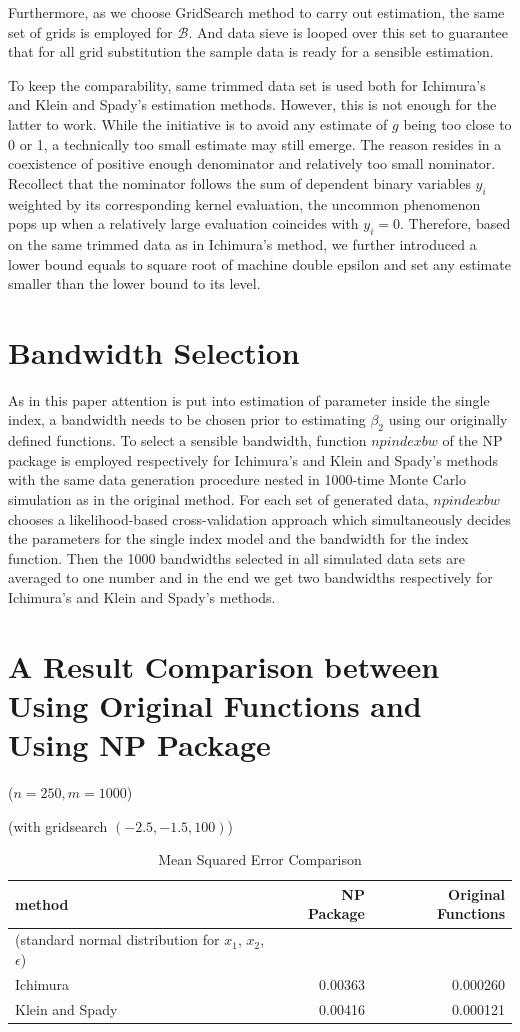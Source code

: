 \documentclass[a4paper]{article}
\begin{document}
Furthermore, as we choose GridSearch method to carry out estimation, the same set of grids is employed for $\mathcal{B}$. And data sieve is looped over this set to guarantee that for all grid substitution the sample data is ready for a sensible estimation.

To keep the comparability, same trimmed data set is used both for Ichimura's and Klein and Spady's estimation methods. However, this is not enough for the latter to work. While the initiative is to avoid any estimate of $g$ being too close to 0 or 1, a technically too small estimate may still emerge. The reason resides in a coexistence of positive enough denominator and relatively too small nominator. Recollect that the nominator follows the sum of dependent binary variables $y_i$ weighted by its corresponding kernel evaluation, the uncommon phenomenon pops up when a relatively large evaluation coincides with $y_i = 0$. Therefore, based on the same trimmed data as in Ichimura's method, we further introduced a lower bound equals to square root of machine double epsilon and set any estimate smaller than the lower bound to its level.

\section{Bandwidth Selection}
As in this paper attention is put into estimation of parameter inside the single index, a bandwidth needs to be chosen prior to estimating $\beta_2$ using our originally defined functions. To select a sensible bandwidth, function $npindexbw$ of the NP package is employed respectively for Ichimura's and Klein and Spady's methods with the same data generation procedure nested in 1000-time Monte Carlo simulation as in the original method. For each set of generated data, $npindexbw$ chooses a likelihood-based cross-validation approach which simultaneously decides the parameters for the single index model and the bandwidth for the index function. Then the 1000 bandwidths selected in all simulated data sets are averaged to one number and in the end we get two bandwidths respectively for Ichimura's and Klein and Spady's methods.

\section{A Result Comparison between Using Original Functions and Using NP Package}
($n = 250, m = 1000$)

\begin{table}[H]
\caption {Mean Squared Error Comparison} \label{tab:mean squared error}

(with gridsearch $(-2.5, -1.5, 100)$)

\begin{tabular}{l r r}

\toprule
\textbf{method} & \textbf{NP Package} & \textbf{Original Functions} \tabularnewline\midrule
(standard normal distribution for $x_1$, $x_2$, $\epsilon$) & &
\tabularnewline
Ichimura & 0.00363 & 0.000260 \tabularnewline
Klein and Spady & 0.00416 & 0.000121 \tabularnewline

\bottomrule
\end{tabular}
\end{table}
\end{document}

